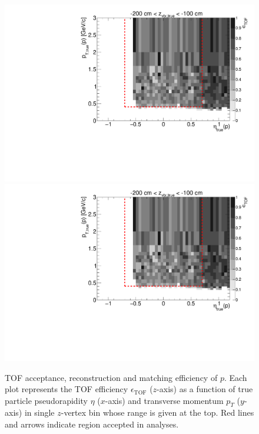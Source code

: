 \begin{figure}[hb]
\caption[TOF acceptance, reconstruction and matching efficiency of $p$.]{TOF acceptance, reconstruction and matching efficiency of $p$. Each plot represents the TOF efficiency $\epsilon_{\text{TOF}}$ ($z$-axis) as a function of true particle pseudorapidity $\eta$ ($x$-axis) and transverse momentum $p_{T}$ ($y$-axis) in single $z$-vertex bin whose range is given at the top. Red lines and arrows indicate region accepted in analyses.}\label{fig:tofEff_proton_plus}
\centering
\parbox{0.495\textwidth}{
  \centering
  \includegraphics[width=\linewidth,page=3]{graphics/eff/Eff2D_TOF_proton_Plus.pdf}\\
  \includegraphics[width=\linewidth,page=5]{graphics/eff/Eff2D_TOF_proton_Plus.pdf}\\
}
\end{figure}
